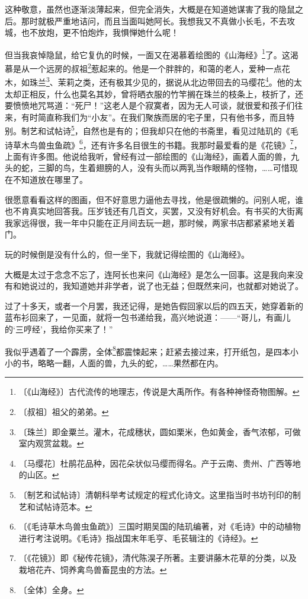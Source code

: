 \documentclass[12pt,UTF-8,openany]{ctexbook}
\begin{document}
\begin{normalsize}
    这种敬意，虽然也逐渐淡薄起来，但完全消失，大概是在知道她谋害了我的隐鼠之后。那时就极严重地诘问，而且当面叫她阿长。我想我又不真做小长毛，不去攻城，也不放炮，更不怕炮炸，我惧惮她什么呢！
    
    但当我哀悼隐鼠，给它复仇的时候，一面又在渴慕着绘图的《山海经》\footnote{〔《山海经》〕古代流传的地理志，传说是大禹所作。有各种神怪奇物图解。}了。这渴慕是从一个远房的叔祖\footnote{〔叔祖〕祖父的弟弟。}惹起来的。他是一个胖胖的，和蔼的老人，爱种一点花木，如珠兰\footnote{〔珠兰〕即金粟兰。灌木，花成穗状，圆如栗米，色如黄金，香气浓郁，可做室内观赏盆栽。}、茉莉之类，还有极其少见的，据说从北边带回去的马缨花\footnote{〔马缨花〕杜鹃花品种，因花朵状似马缨而得名。产于云南、贵州、广西等地的山区。}。他的太太却正相反，什么也莫名其妙，曾将晒衣服的竹竿搁在珠兰的枝条上，枝折了，还要愤愤地咒骂道：“死尸！”这老人是个寂寞者，因为无人可谈，就很爱和孩子们往来，有时简直称我们为“小友”。在我们聚族而居的宅子里，只有他书多，而且特别。制艺和试帖诗\footnote{〔制艺和试帖诗〕清朝科举考试规定的程式化诗文。这里指当时书坊刊印的制艺和试帖诗范本。}，自然也是有的；但我却只在他的书斋里，看见过陆玑的《毛诗草木鸟兽虫鱼疏》\footnote{〔《毛诗草木鸟兽虫鱼疏》〕三国时期吴国的陆玑编著，对《毛诗》中的动植物进行考注说明。《毛诗》指战国末年毛亨、毛苌辑注的《诗经》。}，还有许多名目很生的书籍。我那时最爱看的是《花镜》\footnote{〔《花镜》〕即《秘传花镜》，清代陈淏子所著。主要讲藤木花草的分类，以及栽培花卉、饲养禽鸟兽畜昆虫的方法。}，上面有许多图。他说给我听，曾经有过一部绘图的《山海经》，画着人面的兽，九头的蛇，三脚的鸟，生着翅膀的人，没有头而以两乳当作眼睛的怪物，……可惜现在不知道放在哪里了。
    
    很愿意看看这样的图画，但不好意思力逼他去寻找，他是很疏懒的。问别人呢，谁也不肯真实地回答我。压岁钱还有几百文，买罢，又没有好机会。有书买的大街离我家远得很，我一年中只能在正月间去玩一趟，那时候，两家书店都紧紧地关着门。
    
    玩的时候倒是没有什么的，但一坐下，我就记得绘图的《山海经》。
    
    大概是太过于念念不忘了，连阿长也来问《山海经》是怎么一回事。这是我向来没有和她说过的，我知道她并非学者，说了也无益；但既然来问，也就都对她说了。
    
    过了十多天，或者一个月罢，我还记得，是她告假回家以后的四五天，她穿着新的蓝布衫回来了，一见面，就将一包书递给我，高兴地说道：——“哥儿，有画儿的‘三哼经’，我给你买来了！”
    
    我似乎遇着了一个霹雳，全体\footnote{〔全体〕全身。}都震悚起来；赶紧去接过来，打开纸包，是四本小小的书，略略一翻，人面的兽，九头的蛇，……果然都在内。
    

\end{normalsize}
\end{document}
